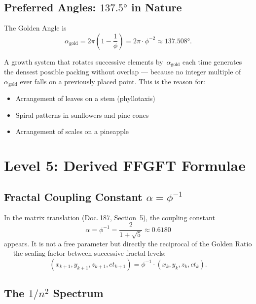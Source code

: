 \subsection{Preferred Angles: $137.5°$ in Nature}

The Golden Angle is
\begin{equation}
  \alpha_{\text{gold}} = 2\pi \left(1 - \frac{1}{\phi}\right)
  = 2\pi \cdot \phi^{-2}
  \approx 137.508°.
\end{equation}

A growth system that rotates successive elements by~$\alpha_{\text{gold}}$
each time generates the densest possible packing without overlap —
because no integer multiple of~$\alpha_{\text{gold}}$ ever falls on
a previously placed point. This is the reason for:
\begin{itemize}
  \item Arrangement of leaves on a stem (phyllotaxis)
  \item Spiral patterns in sunflowers and pine cones
  \item Arrangement of scales on a pineapple
\end{itemize}

\section{Level 5: Derived FFGFT Formulae}

\subsection{Fractal Coupling Constant $\alpha = \phi^{-1}$}

In the matrix translation (Doc.\,187, Section~5), the coupling constant
\begin{equation}
  \alpha = \phi^{-1} = \frac{2}{1+\sqrt{5}} \approx 0.6180
\end{equation}
appears. It is not a free parameter but directly the reciprocal of
the Golden Ratio — the scaling factor between successive fractal
levels:
\begin{equation}
  (x_{k+1}, y_{k+1}, z_{k+1}, ct_{k+1}) = \phi^{-1} \cdot
  (x_k, y_k, z_k, ct_k).
\end{equation}

\subsection{The $1/n^2$ Spectrum}
\label{sec:188_spektrum}


